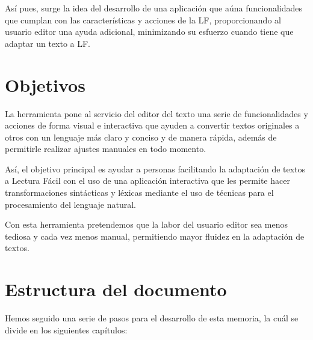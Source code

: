 \setlength{\parskip}{10pt} 
 
Así pues, surge la idea del desarrollo de una aplicación que aúna funcionalidades que cumplan con las características y acciones de la LF, proporcionando al usuario editor una ayuda adicional, minimizando su esfuerzo cuando tiene que adaptar un texto a LF.


\section{Objetivos}
La herramienta pone al servicio del editor del texto una serie de funcionalidades y acciones de forma visual e interactiva que ayuden a convertir textos originales a otros con un lenguaje más claro y conciso y de manera rápida, además de permitirle realizar ajustes manuales en todo momento. 

 \setlength{\parskip}{10pt}
 
Así, el objetivo principal es ayudar a personas facilitando la adaptación de textos a Lectura Fácil con el uso de una aplicación interactiva que les permite hacer transformaciones sintácticas y léxicas mediante el uso de técnicas para el procesamiento del lenguaje natural. 

Con esta herramienta pretendemos que la labor del usuario editor sea menos tediosa y cada vez menos manual, permitiendo mayor fluidez en la adaptación de textos.
 

\section{Estructura del documento}


Hemos seguido una serie de pasos para el desarrollo de esta memoria, la cuál se divide en los siguientes capítulos:

